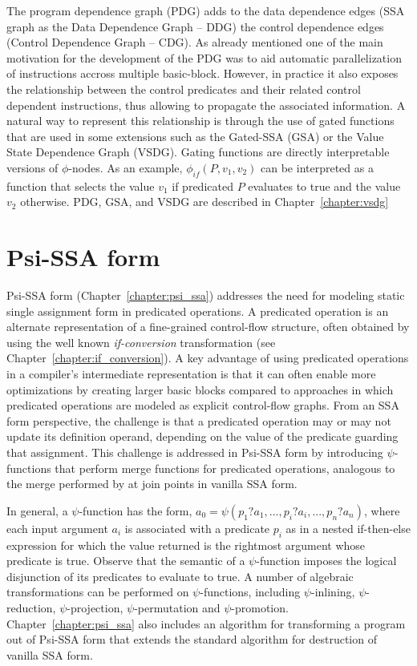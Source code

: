 The program dependence graph (PDG) adds to the data dependence edges (SSA graph as the Data Dependence Graph -- DDG) the control dependence edges (Control Dependence Graph -- CDG).
As already mentioned one of the main motivation for the development of the PDG was to aid automatic parallelization of instructions accross multiple basic-block.
However, in practice it also exposes the relationship between the control predicates and their related control dependent instructions, thus allowing to propagate the associated information.
A natural way to represent this relationship is through the use of gated functions that are used in some extensions such as the Gated-SSA (GSA) or the Value State Dependence Graph (VSDG).
Gating functions are directly interpretable versions of $\phi$-nodes.
As an example, $\phi_\textit{if}(P, v_1, v_2)$ can be interpreted as a function that selects the value $v_1$ if predicated $P$ evaluates to true and the value $v_2$ otherwise.
PDG, GSA, and VSDG are described in Chapter~\ref{chapter:vsdg}

\section{Psi-SSA form}

Psi-SSA form (Chapter~\ref{chapter:psi_ssa}) addresses the need for modeling static single assignment form in predicated operations. 
A predicated operation is an alternate representation of a fine-grained control-flow structure, often obtained by using the well known {\em if-conversion} transformation (see Chapter~\ref{chapter:if_conversion}). 
A key advantage of using predicated operations in a compiler's intermediate representation is that it can often enable more optimizations by creating larger basic blocks compared to approaches in which predicated operations are modeled as explicit control-flow graphs. 
From an SSA form perspective, the challenge is that a predicated operation may or may not update its definition operand, depending on the value of the predicate guarding that assignment. 
This challenge is addressed in Psi-SSA form by introducing $\psi$-functions that perform merge functions for predicated operations, analogous to the merge performed by \phifuns at join points in vanilla SSA form.

In general, a $\psi$-function has the form, $a_0 = \psi\left(p_1?a_1, ..., p_i?a_i, ..., p_n?a_n\right)$, where each input argument $a_i$ is associated with a predicate $p_i$ as in a nested if-then-else expression for which the value returned is the rightmost argument whose predicate is true. 
Observe that the semantic of a $\psi$-function imposes the logical disjunction of its predicates to evaluate to true. 
A number of algebraic transformations can be performed on $\psi$-functions, including $\psi$-inlining, $\psi$-reduction, $\psi$-projection, $\psi$-permutation and $\psi$-promotion. 
Chapter~\ref{chapter:psi_ssa} also includes an algorithm for transforming a program out of Psi-SSA form that extends the standard algorithm for destruction of vanilla SSA form. 


